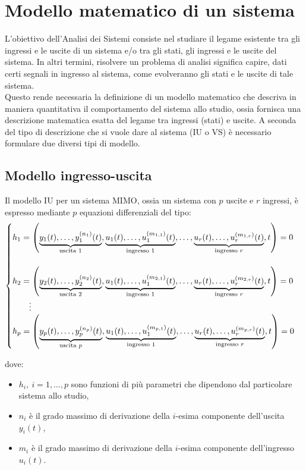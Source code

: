 \documentclass[a4paper]{article}
\theoremstyle{definition}
\begin{document}
	\section{Modello matematico di un sistema}
		L'obiettivo dell'Analisi dei Sistemi consiste nel studiare il legame esistente tra gli ingressi e le uscite di un sistema e/o tra gli stati, gli ingressi e le uscite del sistema.
		In altri termini, risolvere un problema di analisi significa capire, dati certi segnali in ingresso al sistema, come evolveranno gli stati e le uscite di tale sistema.\\
		Questo rende necessaria la definizione di un modello matematico che descriva in maniera quantitativa il comportamento del sistema allo studio, ossia fornisca una descrizione matematica esatta del legame tra ingressi (stati) e uscite.
		A seconda del tipo di descrizione che si vuole dare al sistema (IU o VS) è necessario formulare due diversi tipi di modello.
		
		\subsection{Modello ingresso-uscita}
			Il modello IU per un sistema MIMO, ossia un sistema con $ p $ uscite e $ r $ ingressi, è espresso mediante $ p $ equazioni differenziali del tipo:
			\[
				\begin{cases}
					h_1 = \left(\underbrace{ y_1(t), \dots, y_1^{(n_1)}(t) }_{\textup{uscita 1}}, 
						\underbrace{ u_1(t), \dots, u_1^{(m_{1,1})}(t) }_{\textup{ingresso 1}}, \dots,
						\underbrace{ u_r(t), \dots, u_r^{(m_{1,r})}(t) }_{\textup{ingresso }r}, t
					\right) = 0\\ \\
					h_2 = \left(\underbrace{ y_2(t), \dots, y_2^{(n_2)}(t) }_{\textup{uscita 2}}, 
						\underbrace{ u_1(t), \dots, u_1^{(m_{2,1})}(t) }_{\textup{ingresso 1}}, \dots,
						\underbrace{ u_r(t), \dots, u_r^{(m_{2,r})}(t) }_{\textup{ingresso }r}, t
					\right) = 0\\
					\qquad \vdots \\
					h_p = \left(\underbrace{ y_p(t), \dots, y_p^{(n_p)}(t) }_{\textup{uscita }p}, 
						\underbrace{ u_1(t), \dots, u_1^{(m_{p,1})}(t) }_{\textup{ingresso 1}}, \dots,
						\underbrace{ u_r(t), \dots, u_r^{(m_{p,r})}(t) }_{\textup{ingresso }r}, t
					\right) = 0\\
				\end{cases}
			\]
			
			dove:
			\begin{itemize}
				\item $ h_i,\ i = 1,\dots, p $ sono funzioni di più parametri che dipendono dal particolare
				sistema allo studio,
				\item $ n_i $ è il grado massimo di derivazione della $ i$-esima componente dell'uscita $ y_i(t) $,
				\item $ m_i $ è il grado massimo di derivazione della $ i$-esima componente dell'ingresso $ u_i(t) $.
			\end{itemize}
			
\end{document}
